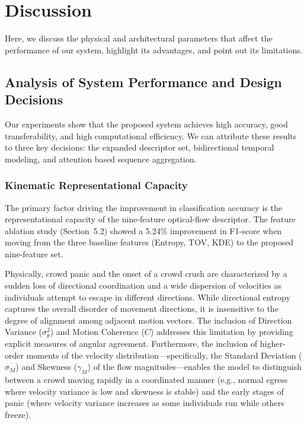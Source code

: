 \section{Discussion}

Here, we discuss the physical and architectural parameters that affect the performance of our system, highlight its advantages, and point out its limitations.

\subsection{Analysis of System Performance and Design Decisions}

Our experiments show that the proposed system achieves high accuracy, good transferability, and high computational efficiency. We can attribute these results to three key decisions: the expanded descriptor set, bidirectional temporal modeling, and attention based sequence aggregation.

\subsubsection{Kinematic Representational Capacity}
The primary factor driving the improvement in classification accuracy is the representational capacity of the nine-feature optical-flow descriptor. The feature ablation study (Section~5.2) showed a 5.24\% improvement in F1-score when moving from the three baseline features (Entropy, TOV, KDE) to the proposed nine-feature set. 

Physically, crowd panic and the onset of a crowd crush are characterized by a sudden loss of directional coordination and a wide dispersion of velocities as individuals attempt to escape in different directions. While directional entropy captures the overall disorder of movement directions, it is insensitive to the degree of alignment among adjacent motion vectors. The inclusion of Direction Variance ($\sigma^2_\theta$) and Motion Coherence ($C$) addresses this limitation by providing explicit measures of angular agreement. Furthermore, the inclusion of higher-order moments of the velocity distribution---specifically, the Standard Deviation ($\sigma_M$) and Skewness ($\gamma_M$) of the flow magnitudes---enables the model to distinguish between a crowd moving rapidly in a coordinated manner (e.g., normal egress where velocity variance is low and skewness is stable) and the early stages of panic (where velocity variance increases as some individuals run while others freeze).

